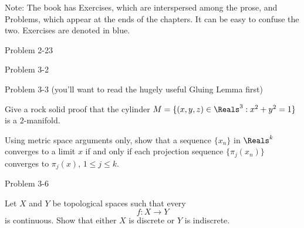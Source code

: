 \documentclass[minion]{homework651}
\begin{document}
Note: The book has Exercises, which are interspersed among the
prose, and Problems, which appear at the ends of the chapters.
It can be easy to confuse the two.  Exercises are denoted in blue.

\begin{problems}

\problem Problem 2-23

\problem Problem 3-2

\problem Problem 3-3 (you'll want to read the hugely useful Gluing Lemma first)

\problem {}

\problem Give a rock solid proof that the cylinder 
$M=\{(x,y,z)\in\Reals^3:x^2+y^2=1\}$
is a $2$-manifold.

\problem Using metric space arguments only, show that
a sequence $\{x_n\}$ in $\Reals^k$ converges to a limit $x$
if and only if each projection sequence $\{\pi_j(x_n)\}$ 
converges to $\pi_j(x)$, $1\le j\le k$.

\problem Problem 3-6

\problem Let
$X$ and $Y$ be topological spaces such that every
\[
f:X\to Y
\]
is continuous.  Show that either $X$ is discrete or $Y$ is indiscrete.

\end{problems}
\end{document}
